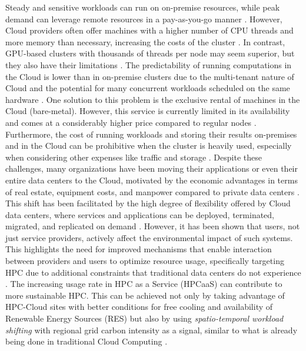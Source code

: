      Steady and sensitive workloads can run on on-premise resources, while peak demand can leverage remote resources in a pay-as-you-go manner \cite{netto_hpc_2019}. However, Cloud providers often offer machines with a higher number of CPU threads and more memory than necessary, increasing the costs of the cluster \cite{gurgul_cloud-native_2023}. In contrast, GPU-based clusters with thousands of threads per node may seem superior, but they also have their limitations \cite{gurgul_cloud-native_2023}. The predictability of running computations in the Cloud is lower than in on-premise clusters due to the multi-tenant nature of Cloud and the potential for many concurrent workloads scheduled on the same hardware \cite{gurgul_cloud-native_2023}. One solution to this problem is the exclusive rental of machines in the Cloud (bare-metal). However, this service is currently limited in its availability and comes at a considerably higher price compared to regular nodes \cite{gurgul_cloud-native_2023}. Furthermore, the cost of running workloads and storing their results on-premises and in the Cloud can be prohibitive when the cluster is heavily used, especially when considering other expenses like traffic and storage \cite{gadban_analyzing_2022}. Despite these challenges, many organizations have been moving their applications or even their entire data centers to the Cloud, motivated by the economic advantages in terms of real estate, equipment costs, and manpower compared to private data centers \cite{alashaikh_survey_2021}. This shift has been facilitated by the high degree of flexibility offered by Cloud data centers, where services and applications can be deployed, terminated, migrated, and replicated on demand \cite{alashaikh_survey_2021}. However, it has been shown that users, not just service providers, actively affect the environmental impact of such systems. This highlights the need for improved mechanisms that enable interaction between providers and users to optimize resource usage, specifically targeting HPC due to additional constraints that traditional data centers do not experience \cite{silva_review_2024}. The increasing usage rate in HPC as a Service (HPCaaS) can contribute to more sustainable HPC. This can be achieved not only by taking advantage of HPC-Cloud sites with better conditions for free cooling and availability of Renewable Energy Sources (RES) but also by using \textit{spatio-temporal workload shifting} with regional grid carbon intensity as a signal, similar to what is already being done in traditional Cloud Computing \cite{silva_review_2024}.


